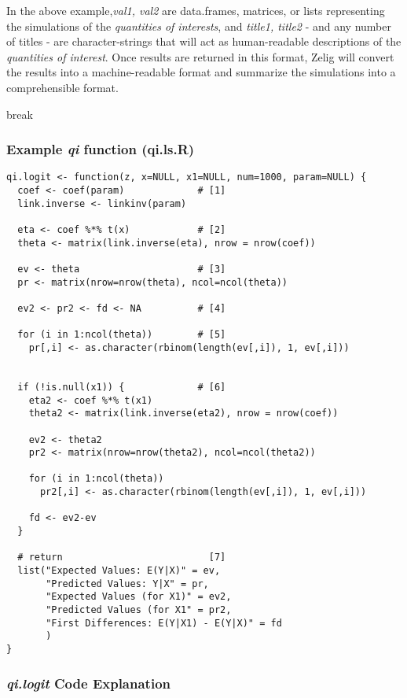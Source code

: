 In the above example,\emph{val1, val2} are data.frames, matrices, or lists representing the simulations of the \emph{quantities of interests}, and \emph{title1, title2} - and any number of titles - are character-strings that will act as human-readable descriptions of the \emph{quantities of interest}.  Once results are returned in this format, Zelig will convert the results into a machine-readable format and summarize the simulations into a comprehensible format.




%

\page break

\subsubsection{Example \emph{qi} function (qi.ls.R)}


\begin{verbatim}
qi.logit <- function(z, x=NULL, x1=NULL, num=1000, param=NULL) {
  coef <- coef(param)             # [1]
  link.inverse <- linkinv(param)

  eta <- coef %*% t(x)            # [2]
  theta <- matrix(link.inverse(eta), nrow = nrow(coef))

  ev <- theta                     # [3]
  pr <- matrix(nrow=nrow(theta), ncol=ncol(theta))

  ev2 <- pr2 <- fd <- NA          # [4]

  for (i in 1:ncol(theta))        # [5]
    pr[,i] <- as.character(rbinom(length(ev[,i]), 1, ev[,i]))


  if (!is.null(x1)) {             # [6]
    eta2 <- coef %*% t(x1)
    theta2 <- matrix(link.inverse(eta2), nrow = nrow(coef))

    ev2 <- theta2
    pr2 <- matrix(nrow=nrow(theta2), ncol=ncol(theta2))

    for (i in 1:ncol(theta))
      pr2[,i] <- as.character(rbinom(length(ev[,i]), 1, ev[,i]))

    fd <- ev2-ev
  }

  # return                          [7]
  list("Expected Values: E(Y|X)" = ev,
       "Predicted Values: Y|X" = pr,
       "Expected Values (for X1)" = ev2,
       "Predicted Values (for X1" = pr2,
       "First Differences: E(Y|X1) - E(Y|X)" = fd
       )
}

\end{verbatim}


\subsubsection{\emph{qi.logit} Code Explanation}

